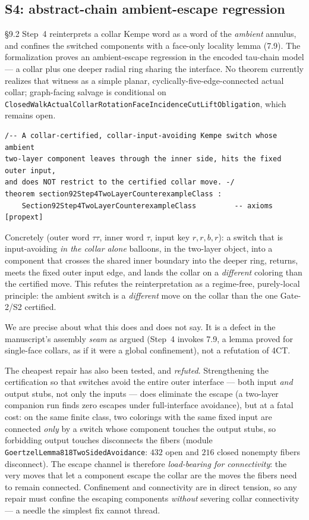 \documentclass[11pt]{article}
\theoremstyle{definition}
\begin{document}
\subsection{S4: abstract-chain ambient-escape regression}

\S9.2 Step~4 reinterprets a collar Kempe word as a word of the \emph{ambient}
annulus, and confines the switched components with a face-only locality lemma
(7.9). The formalization proves an ambient-escape regression in the encoded
tau-chain model --- a collar plus one deeper radial ring sharing the interface.
No theorem currently realizes that witness as a simple planar,
cyclically-five-edge-connected actual collar; graph-facing salvage is
conditional on
\texttt{ClosedWalkActualCollarRotationFaceIncidenceCutLiftObligation}, which
remains open.
\begin{lstlisting}[language={}]
/-- A collar-certified, collar-input-avoiding Kempe switch whose ambient
two-layer component leaves through the inner side, hits the fixed outer input,
and does NOT restrict to the certified collar move. -/
theorem section92Step4TwoLayerCounterexampleClass :
    Section92Step4TwoLayerCounterexampleClass         -- axioms [propext]
\end{lstlisting}
Concretely (outer word $\tau\tau$, inner word $\tau$, input key $r,r,b,r$): a
switch that is input-avoiding \emph{in the collar alone} balloons, in the
two-layer object, into a component that crosses the shared inner boundary into the
deeper ring, returns, meets the fixed outer input edge, and lands the collar on a
\emph{different} coloring than the certified move. This refutes the reinterpretation
as a regime-free, purely-local principle: the ambient switch is a \emph{different}
move on the collar than the one Gate-2/S2 certified.

We are precise about what this does and does not say. It is a defect in the
manuscript's assembly \emph{seam} as argued (Step~4 invokes 7.9, a lemma proved
for single-face collars, as if it were a global confinement), not a refutation of
4CT.

The cheapest repair has also been tested, and \emph{refuted}. Strengthening the
certification so that switches avoid the entire outer interface --- both input
\emph{and} output stubs, not only the inputs --- does eliminate the escape (a
two-layer companion run finds zero escapes under full-interface avoidance), but at
a fatal cost: on the same finite class, two colorings with the same fixed input
are connected \emph{only} by a switch whose component touches the output stubs, so
forbidding output touches disconnects the fibers (module
\texttt{GoertzelLemma818TwoSidedAvoidance}: $432$ open and $216$ closed nonempty
fibers disconnect). The escape channel is therefore \emph{load-bearing for
connectivity}: the very moves that let a component escape the collar are the moves
the fibers need to remain connected. Confinement and connectivity are in direct
tension, so any repair must confine the escaping components \emph{without}
severing collar connectivity --- a needle the simplest fix cannot thread.
\end{document}
